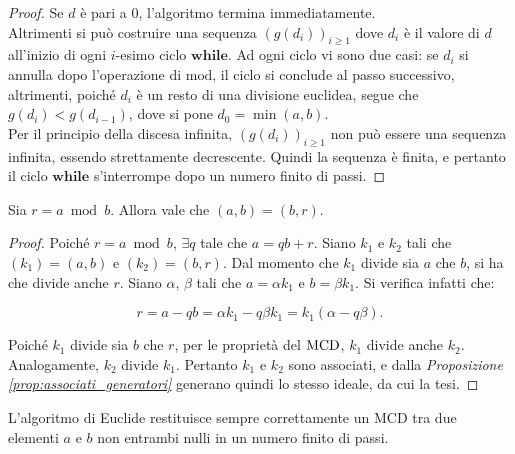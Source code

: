 \documentclass[11pt]{scrbook}
\begin{document}
\begin{proof}
    Se $d$ è pari a $0$, l'algoritmo termina immediatamente. \\

    Altrimenti si può costruire una sequenza $(g(d_i))_{i\geq1}$ dove $d_i$ è il valore di $d$ all'inizio
    di ogni $i$-esimo ciclo $\textbf{while}$. Ad ogni ciclo vi sono due casi: se $d_i$ si annulla dopo
    l'operazione di $\mathrm{mod}$, il ciclo si conclude al passo successivo, altrimenti,
    poiché $d_i$ è un resto di una divisione euclidea, segue che $g(d_i)<g(d_{i-1})$, dove
    si pone $d_{0}=\min(a, b)$. \\

    Per il principio della discesa infinita, $(g(d_i))_{i\geq1}$ non può essere
    una sequenza infinita, essendo strettamente decrescente. Quindi la sequenza è
    finita, e pertanto il ciclo $\textbf{while}$ s'interrompe dopo un numero finito
    di passi.
\end{proof}

\begin{lemma}
    \label{lem:generatori_euclide}
    Sia $r = a \bmod b$. Allora vale che $(a,b)=(b,r)$.
\end{lemma}

\begin{proof}
    Poiché $r = a \bmod b$, $\exists q$ tale che $a = qb + r$.
    Siano $k_1$ e $k_2$ tali che $(k_1)=(a,b)$ e $(k_2)=(b,r)$. Dal
    momento che $k_1$ divide sia $a$ che $b$, si ha che divide anche
    $r$. Siano $\alpha$, $\beta$ tali che $a = \alpha k_1$ e
    $b = \beta k_1$. Si verifica infatti che:

    \[ r = a - qb = \alpha k_1 - q \beta k_1 = k_1 (\alpha - q \beta). \]

    Poiché $k_1$ divide sia $b$ che $r$, per le proprietà del $\operatorname{MCD}$,
    $k_1$ divide anche $k_2$. Analogamente, $k_2$ divide $k_1$. Pertanto
    $k_1$ e $k_2$ sono associati, e dalla \textit{Proposizione \ref{prop:associati_generatori}} generano quindi lo stesso ideale, da
    cui la tesi.
\end{proof}

\begin{theorem}
    L'algoritmo di Euclide restituisce sempre correttamente un MCD tra due elementi $a$ e $b$ non entrambi nulli in un numero finito di passi.
\end{theorem}
\end{document}
